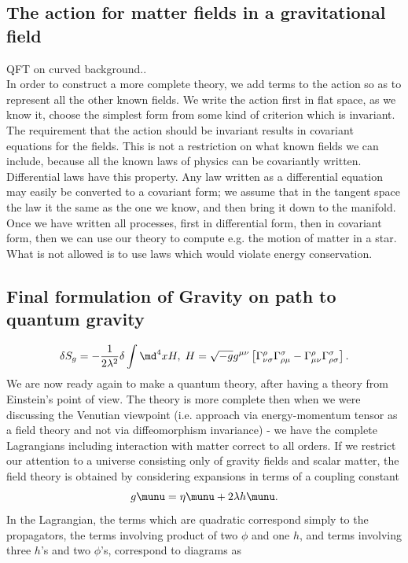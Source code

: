 \subsection{The action for matter fields in a gravitational field}
QFT on curved background..\\
In order to construct a more complete theory, we add terms to the action so as to represent all the other known fields. We write the action first in flat space, as we know it, choose the simplest form from some kind of criterion which is invariant. The requirement that the action should be invariant results in covariant equations for the fields. This is not a restriction on what known fields we can include, because all the known laws of physics can be covariantly written. Differential laws have this property. Any law written as a differential equation may easily be converted to a covariant form; we assume that in the tangent space the law it the same as the one we know, and then bring it down to the manifold. Once we have written all processes, first in differential form, then in covariant form, then we can use our theory to compute e.g. the motion of matter in a star. What is not allowed is to use laws which would violate energy conservation.
\subsection{Final formulation of Gravity on path to quantum gravity}
\begin{equation}
	\delta S_g = - \frac{1}{2 \lambda^2} \delta \int \md^4x H, \; H= \sqrt{-g} g^{\mu \nu} \left[\Gamma^\rho_{\nu\sigma} \Gamma^\sigma_{\rho \mu} - \Gamma^\rho_{\mu \nu} \Gamma^\sigma_{\rho \sigma}\right].
\end{equation}
We are now ready again to make a quantum theory, after having a theory from Einstein's point of view. The theory is more complete then when we were discussing the Venutian viewpoint (i.e. approach via energy-momentum tensor as a field theory and not via diffeomorphism invariance) -  we have the complete Lagrangians including interaction with matter correct to all orders. If we restrict our attention to a universe consisting only of gravity fields and scalar matter, the field theory is obtained by considering expansions in terms of a coupling constant
\begin{equation}
	g\munu=\eta\munu+2\lambda h\munu.
\end{equation}
In the Lagrangian, the terms which are quadratic correspond simply to the propagators, the terms involving product of two $\phi$ and one $h$, and terms involving three $h$'s and two $\phi$'s, correspond to diagrams as

